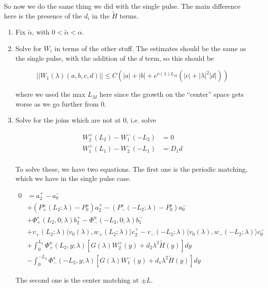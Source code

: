 \documentclass[12pt]{article}
\begin{document}
So now we do the same thing we did with the single pulse. The main difference here is the presence of the $d_i$ in the $\tilde{H}$ terms. 

\begin{enumerate}

\item Fix $\tilde{\alpha}$, with $0 < \tilde{\alpha} < \alpha$. 

\item Solve for $W_i$ in terms of the other stuff. The estimates should be the same as the single pulse, with the addition of the $d$ term, so this should be

\[
||W_1(\lambda)(a,b,c,d)|| \leq C (|a| + |b| + e^{\nu(\lambda)L_M}(|c| + |\lambda|^2 |d| ))
\]

where we used the max $L_M$ here since the growth on the ``center'' space gets worse as we go further from 0.

\item Solve for the joins which are not at 0, i.e. solve

\begin{align*}
W_2^+(L_2) - W_1^-(-L_2) &= 0 \\
W_1^+(L_1) - W_2^-(-L_1) &= D_1 d \\
\end{align*}

To solve these, we have two equations. The first one is the periodic matching, which we have in the single pulse case.

\begin{align*}
0 &= a_2^+ - a_0^- \\
&+ (P^u_+(L_2; \lambda) - P_0^u)a_2^+ - (P^s_-(-L_2; \lambda) - P_0^s)a_0^- \\
&+ \Phi^s_+(L_2, 0; \lambda)b_2^+ - \Phi^u_-(-L_2, 0; \lambda)b_1^- \\
&+ v_+(L_2; \lambda) \langle v_0(\lambda), w_+(L_2; \lambda) \rangle c_2^+ - v_-(-L_2; \lambda) \langle v_0(\lambda), w_-(-L_2; \lambda) \rangle c_0^- \\
&+ \int_0^{L_2} \Phi^u_+(L_2, y; \lambda) [ G(\lambda)W_2^+(y) + d_2 \lambda^2 \tilde{H}(y) ] dy \\
&- \int_0^{-L_2} \Phi^s_-(-L_2, y; \lambda) [ G(\lambda)W_1^-(y) + d_1 \lambda^2 \tilde{H}(y) ] dy
\end{align*}

The second one is the center matching at $\pm L$.


\end{enumerate}
\end{document}
